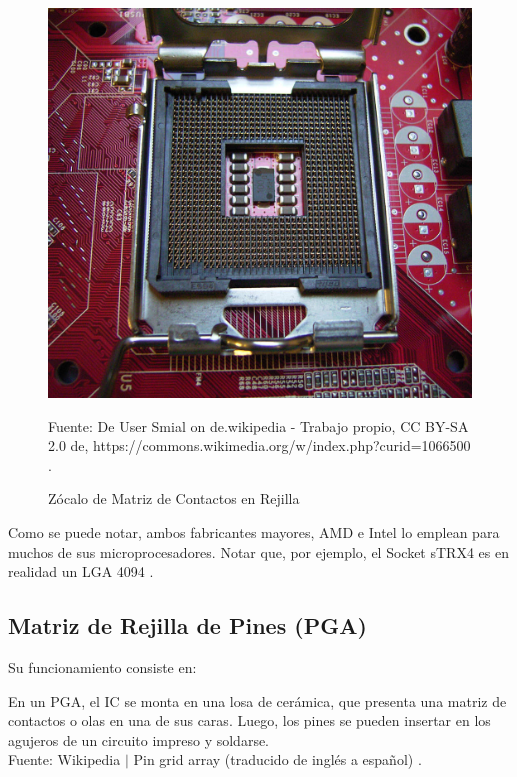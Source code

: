 \documentclass[conference]{IEEEtran}
\begin{document}
\begin{figure}[H]
    \centering
    \includegraphics[width=0.2\paperwidth]{images/lga-socket.jpg}
    \caption{Zócalo de Matriz de Contactos en Rejilla} \footnotesize
    Fuente: De User Smial on de.wikipedia - Trabajo propio, CC BY-SA 2.0 de, https://commons.wikimedia.org/w/index.php?curid=1066500 \cite{wikipedia-lga-2021D}.
\end{figure}

\bigbreak

Como se puede notar, ambos fabricantes mayores, AMD e Intel lo emplean para muchos de sus microprocesadores. Notar que, por ejemplo, el Socket sTRX4 es en realidad un LGA 4094 \cite{wikipedia-lga-2021D}.

\subsection{Matriz de Rejilla de Pines (PGA)}

Su funcionamiento consiste en:

\bigbreak

\begin{displayquote}
    En un PGA, el IC se monta en una losa de cerámica, que presenta una matriz de contactos o olas en una de sus caras. Luego, los pines se pueden insertar en los agujeros de un circuito impreso y soldarse.\\
    \small
    Fuente: Wikipedia $\mid$ Pin grid array (traducido de inglés a español) \cite{wikipedia-pga-2021C}.
\end{displayquote}
\end{document}
